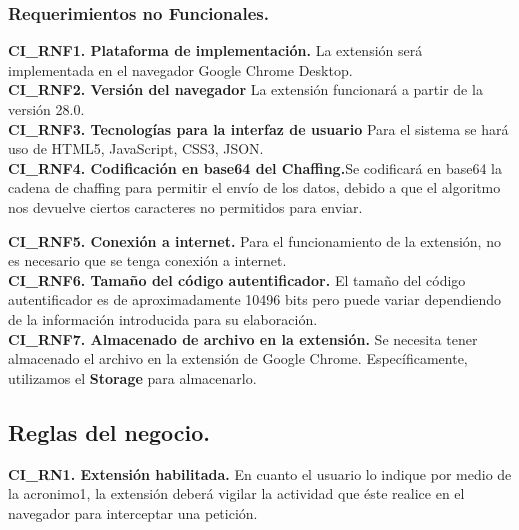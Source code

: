 \documentclass[12pt, a4paper, titlepage]{report}
\begin{document}
				\subsubsection{Requerimientos no Funcionales.}
				{\setlength{\parindent}{12pt}
				
				\textbf{CI\_RNF1. Plataforma de implementación.} La extensión será implementada en el navegador Google Chrome Desktop.\\
				
				\textbf{CI\_RNF2. Versión del navegador} La extensión funcionará a partir de la versión 28.0.\\
				
				\textbf{CI\_RNF3. Tecnologías para la interfaz de usuario} Para el sistema se hará uso de HTML5, JavaScript, CSS3, JSON.\\
				
				\textbf{CI\_RNF4. Codificación en base64 del Chaffing.}Se codificará en base64 la cadena de chaffing para permitir el envío de los datos, debido a que el algoritmo nos devuelve ciertos caracteres no permitidos para enviar.\\
				\label{CI_RNF4}
				
				\textbf{CI\_RNF5. Conexión a internet.} Para el funcionamiento de la extensión, no es necesario que se tenga conexión a internet.\\
				
				\textbf{CI\_RNF6. Tamaño del código autentificador.} El tamaño del código autentificador es de aproximadamente 10496 bits pero puede variar dependiendo de la información introducida para su elaboración.\\
				
				\textbf{CI\_RNF7. Almacenado de archivo en la extensión.} Se necesita tener almacenado el archivo en la extensión de Google Chrome. Específicamente, utilizamos el \textbf{Storage} para almacenarlo. \\
				
			    }
		    
		    \subsection{Reglas del negocio.}
		    
		    \textbf{CI\_RN1. Extensión habilitada.} En cuanto el usuario lo indique por medio de la \acrlong{acronimo1}, la extensión deberá vigilar la actividad que éste realice en el navegador para interceptar una petición.\\
			\label{CI_RN1}
			
\end{document}
